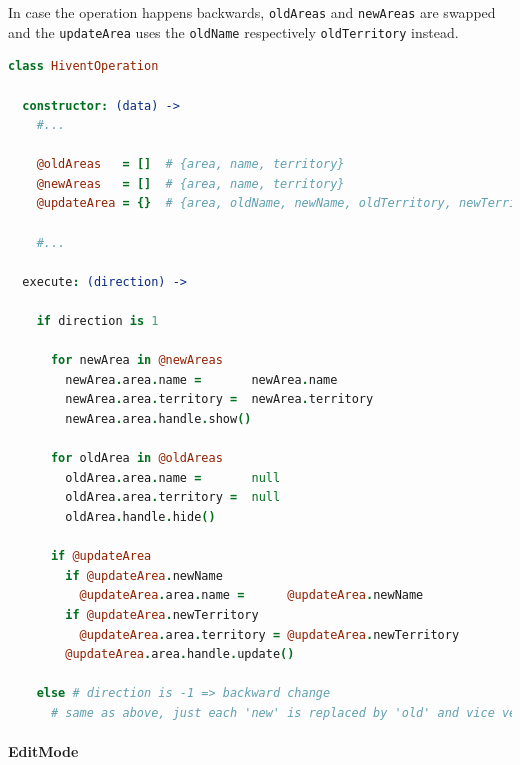 In case the operation happens backwards, \texttt{oldAreas} and \texttt{newAreas} are swapped and the \texttt{updateArea} uses the \texttt{oldName} respectively \texttt{oldTerritory} instead.

\begin{center}
\begin{minipage}[t]{0.8\textwidth}
\begin{lstlisting}[language=coffeescript,
  caption=Execution of an \texttt{HiventOperation},
  label=lst:hivent_operation]
class HiventOperation

  constructor: (data) ->
    #...

    @oldAreas   = []  # {area, name, territory}
    @newAreas   = []  # {area, name, territory}
    @updateArea = {}  # {area, oldName, newName, oldTerritory, newTerritory}

    #...

  execute: (direction) ->

    if direction is 1

      for newArea in @newAreas
        newArea.area.name =       newArea.name
        newArea.area.territory =  newArea.territory
        newArea.area.handle.show()

      for oldArea in @oldAreas
        oldArea.area.name =       null
        oldArea.area.territory =  null
        oldArea.handle.hide()

      if @updateArea
        if @updateArea.newName
          @updateArea.area.name =      @updateArea.newName
        if @updateArea.newTerritory
          @updateArea.area.territory = @updateArea.newTerritory
        @updateArea.area.handle.update()

    else # direction is -1 => backward change
      # same as above, just each 'new' is replaced by 'old' and vice versa
\end{lstlisting}
\end{minipage}
\end{center}


\paragraph{EditMode} %
\label{par:editmode}

